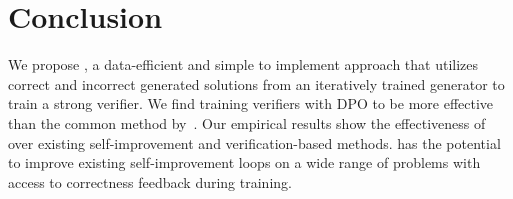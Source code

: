 \section{Conclusion}
We propose \vstar{}, a data-efficient and simple to implement approach that utilizes correct and incorrect generated solutions from an iteratively trained generator to train a strong verifier. We find training verifiers with DPO to be more effective than the common method by~\citet{DBLP:journals/corr/abs-2110-14168}. Our empirical results show the effectiveness of \vstar{} over existing self-improvement and verification-based methods. \vstar{} has the potential to improve existing self-improvement loops on a wide range of problems with access to correctness feedback during training.